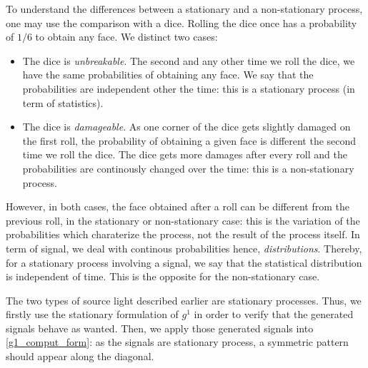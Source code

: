 \documentclass[10pt]{report}
\begin{document}
To understand the differences between a stationary and a non-stationary process, one may use the comparison with a dice. Rolling the dice once has a probability  of $1/6$ to obtain any face. We distinct two cases:
\begin{itemize}
	\item The dice is \textit{unbreakable}. The second and any other time we roll the dice, we have the same probabilities of obtaining any face. We say that the probabilities are independent other the time: this is a stationary process (in term of statistics).
	\item The dice is \textit{damageable}. As one corner of the dice gets slightly damaged on the first roll, the probability of obtaining a given face is different the second time we roll the dice. The dice gets more damages after every roll and the probabilities are continously changed over the time: this is a non-stationary process.
\end{itemize}
However, in both cases, the face obtained after a roll can be different from the previous roll, in the stationary or non-stationary case: this is the variation of the probabilities which charaterize the process, not the result of the process itself. In term of signal, we deal with continous probabilities hence, \textit{distributions}. Thereby, for a stationary process involving a signal, we say that the statistical distribution is independent of time. This is the opposite for the non-stationary case.

The two types of source light described earlier are stationary processes. Thus, we firstly use the stationary formulation of $g^1$ in order to verify that the generated signals behave as wanted. Then, we apply those generated signals into \eqref{g1_comput_form}: as the signals are stationary process, a symmetric pattern should appear along the diagonal.
\end{document}
